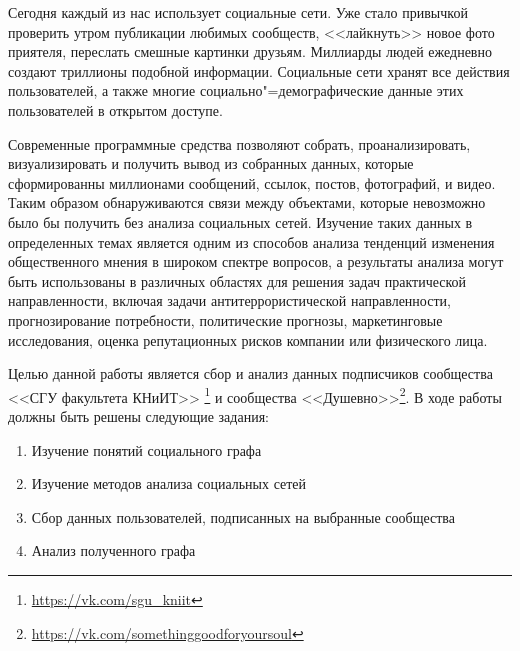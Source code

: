 Сегодня каждый из нас использует социальные сети. Уже стало привычкой проверить утром публикации любимых сообществ, <<лайкнуть>> новое фото приятеля, переслать смешные картинки друзьям. Миллиарды людей ежедневно создают триллионы подобной информации. Социальные сети хранят все действия пользователей, а также многие социально"=демографические данные этих пользователей в открытом доступе. 

Современные программные средства позволяют собрать, проанализировать, визуализировать и получить вывод из собранных данных, которые сформированны миллионами сообщений, ссылок, постов, фотографий, и видео. Таким образом обнаруживаются связи между объектами, которые невозможно было бы получить без анализа социальных сетей. Изучение таких данных в определенных темах является одним из способов анализа тенденций изменения общественного
мнения в широком спектре вопросов, а результаты
анализа могут быть использованы в различных областях для решения задач практической направленности, включая задачи антитеррористической
направленности, прогнозирование потребности,
политические прогнозы, маркетинговые исследования, оценка репутационных рисков компании
или физического лица\cite{Tomsk_research}.

Целью данной работы является сбор и анализ данных подписчиков сообщества <<СГУ факультета КНиИТ>> \footnote{\url{https://vk.com/sgu_kniit}} и сообщества <<Душевно>>\footnote{\url{https://vk.com/somethinggoodforyoursoul}}.
В ходе работы должны быть решены следующие задания:
\begin{enumerate}
    \item Изучение понятий социального графа
    \item Изучение методов анализа социальных сетей
    \item Сбор данных пользователей, подписанных на выбранные сообщества
    \item Анализ полученного графа
\end{enumerate}



